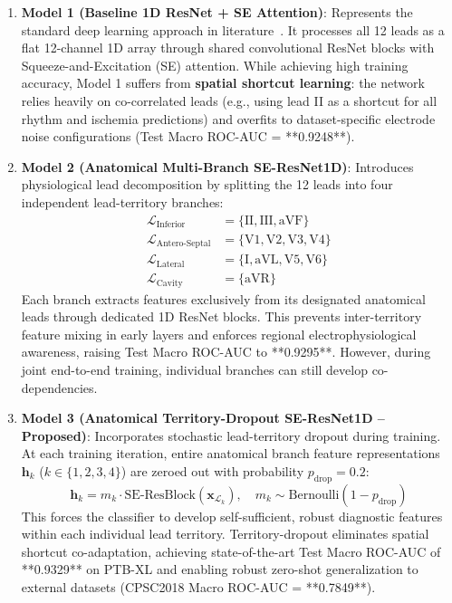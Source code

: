 \documentclass[12pt]{elsarticle}
\begin{document}
\begin{enumerate}
    \item \textbf{Model 1 (Baseline 1D ResNet + SE Attention)}: Represents the standard deep learning approach in literature~\cite{strodthoff2020deep}. It processes all 12 leads as a flat 12-channel 1D array through shared convolutional ResNet blocks with Squeeze-and-Excitation (SE) attention. While achieving high training accuracy, Model 1 suffers from \textbf{spatial shortcut learning}: the network relies heavily on co-correlated leads (e.g., using lead II as a shortcut for all rhythm and ischemia predictions) and overfits to dataset-specific electrode noise configurations (Test Macro ROC-AUC = **0.9248**).
    
    \item \textbf{Model 2 (Anatomical Multi-Branch SE-ResNet1D)}: Introduces physiological lead decomposition by splitting the 12 leads into four independent lead-territory branches:
    \begin{align}
    \mathcal{L}_{\text{Inferior}} &= \{\text{II}, \text{III}, \text{aVF}\} \\
    \mathcal{L}_{\text{Antero-Septal}} &= \{\text{V1}, \text{V2}, \text{V3}, \text{V4}\} \\
    \mathcal{L}_{\text{Lateral}} &= \{\text{I}, \text{aVL}, \text{V5}, \text{V6}\} \\
    \mathcal{L}_{\text{Cavity}} &= \{\text{aVR}\}
    \end{align}
    Each branch extracts features exclusively from its designated anatomical leads through dedicated 1D ResNet blocks. This prevents inter-territory feature mixing in early layers and enforces regional electrophysiological awareness, raising Test Macro ROC-AUC to **0.9295**. However, during joint end-to-end training, individual branches can still develop co-dependencies.
    
    \item \textbf{Model 3 (Anatomical Territory-Dropout SE-ResNet1D -- Proposed)}: Incorporates stochastic lead-territory dropout during training. At each training iteration, entire anatomical branch feature representations $\mathbf{h}_k$ ($k \in \{1, 2, 3, 4\}$) are zeroed out with probability $p_{\text{drop}} = 0.2$:
    \begin{equation}
    \mathbf{h}_k = m_k \cdot \text{SE-ResBlock}(\mathbf{x}_{\mathcal{L}_k}), \quad m_k \sim \text{Bernoulli}(1 - p_{\text{drop}})
    \end{equation}
    This forces the classifier to develop self-sufficient, robust diagnostic features within each individual lead territory. Territory-dropout eliminates spatial shortcut co-adaptation, achieving state-of-the-art Test Macro ROC-AUC of **0.9329** on PTB-XL and enabling robust zero-shot generalization to external datasets (CPSC2018 Macro ROC-AUC = **0.7849**).
\end{enumerate}
\end{document}
